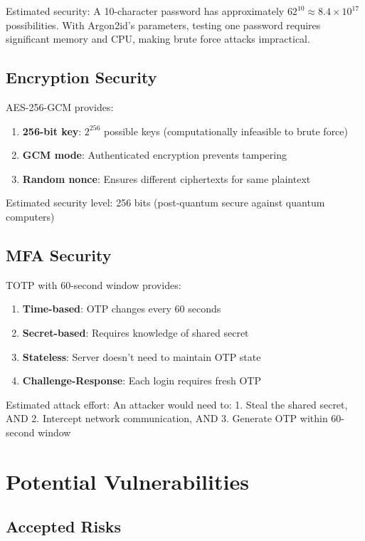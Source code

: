 \documentclass[12pt,a4paper]{report}
\begin{document}
Estimated security: A 10-character password has approximately $62^{10} \approx 8.4 \times 10^{17}$ possibilities. With Argon2id's parameters, testing one password requires significant memory and CPU, making brute force attacks impractical.

\subsection{Encryption Security}

AES-256-GCM provides:

\begin{enumerate}
    \item \textbf{256-bit key}: $2^{256}$ possible keys (computationally infeasible to brute force)
    \item \textbf{GCM mode}: Authenticated encryption prevents tampering
    \item \textbf{Random nonce}: Ensures different ciphertexts for same plaintext
\end{enumerate}

Estimated security level: 256 bits (post-quantum secure against quantum computers)

\subsection{MFA Security}

TOTP with 60-second window provides:

\begin{enumerate}
    \item \textbf{Time-based}: OTP changes every 60 seconds
    \item \textbf{Secret-based}: Requires knowledge of shared secret
    \item \textbf{Stateless}: Server doesn't need to maintain OTP state
    \item \textbf{Challenge-Response}: Each login requires fresh OTP
\end{enumerate}

Estimated attack effort: An attacker would need to:
1. Steal the shared secret, AND
2. Intercept network communication, AND
3. Generate OTP within 60-second window

\section{Potential Vulnerabilities}

\subsection{Accepted Risks}
\end{document}
